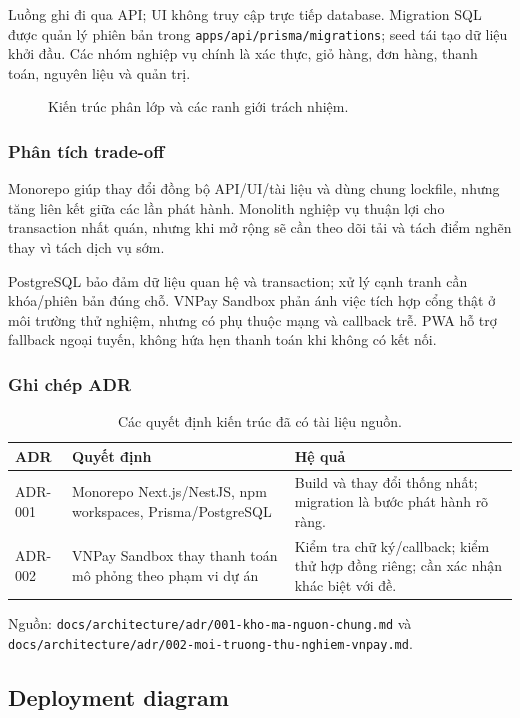 \documentclass[12pt,a4paper]{article}
\newcommand{\tep}[1]{\nolinkurl{#1}}
\begin{document}
Luồng ghi đi qua API; UI không truy cập trực tiếp database. Migration SQL được quản lý phiên bản trong \tep{apps/api/prisma/migrations}; seed tái tạo dữ liệu khởi đầu. Các nhóm nghiệp vụ chính là xác thực, giỏ hàng, đơn hàng, thanh toán, nguyên liệu và quản trị.

\begin{figure}[H]\centering

\caption{Kiến trúc phân lớp và các ranh giới trách nhiệm.}
\end{figure}

\subsubsection{Phân tích trade-off}
Monorepo giúp thay đổi đồng bộ API/UI/tài liệu và dùng chung lockfile, nhưng tăng liên kết giữa các lần phát hành. Monolith nghiệp vụ thuận lợi cho transaction nhất quán, nhưng khi mở rộng sẽ cần theo dõi tải và tách điểm nghẽn thay vì tách dịch vụ sớm.

PostgreSQL bảo đảm dữ liệu quan hệ và transaction; xử lý cạnh tranh cần khóa/phiên bản đúng chỗ. VNPay Sandbox phản ánh việc tích hợp cổng thật ở môi trường thử nghiệm, nhưng có phụ thuộc mạng và callback trễ. PWA hỗ trợ fallback ngoại tuyến, không hứa hẹn thanh toán khi không có kết nối.

\subsubsection{Ghi chép ADR}
\begin{table}[H]\centering\small
\begin{tabularx}{\textwidth}{P{1.5cm}YY}
\toprule\textbf{ADR}&\textbf{Quyết định}&\textbf{Hệ quả}\\\midrule
ADR-001&Monorepo Next.js/NestJS, npm workspaces, Prisma/PostgreSQL&Build và thay đổi thống nhất; migration là bước phát hành rõ ràng.\\
ADR-002&VNPay Sandbox thay thanh toán mô phỏng theo phạm vi dự án&Kiểm tra chữ ký/callback; kiểm thử hợp đồng riêng; cần xác nhận khác biệt với đề.\\
\bottomrule\end{tabularx}\caption{Các quyết định kiến trúc đã có tài liệu nguồn.}
\end{table}
Nguồn: \tep{docs/architecture/adr/001-kho-ma-nguon-chung.md} và \tep{docs/architecture/adr/002-moi-truong-thu-nghiem-vnpay.md}.

\subsection{Deployment diagram}
\end{document}
